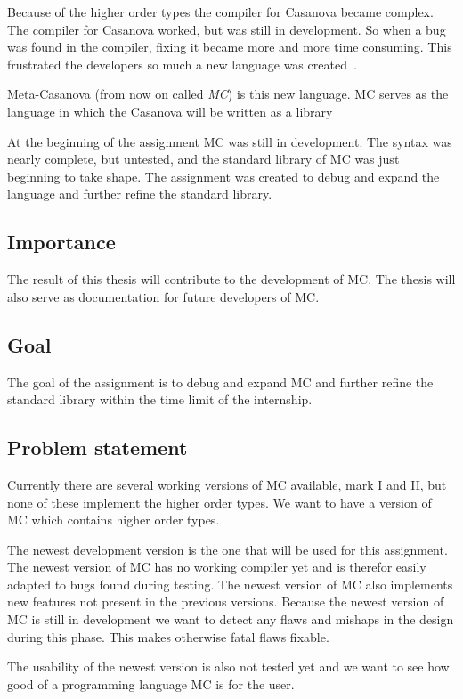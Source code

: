 Because of the higher order types the compiler for Casanova became complex.
The compiler for Casanova worked, but was still in development.
So when a bug was found in the compiler, fixing it became more and more time consuming.
This frustrated the developers so much a new language was created~\cite{giuseppe2015mc}.

Meta-Casanova (from now on called \emph{MC}) is this new language.
MC serves as the language in which the Casanova will be written as a library

At the beginning of the assignment MC was still in development.
The syntax was nearly complete, but untested, and the standard library of MC was just beginning to take shape.
The assignment was created to debug and expand the language and further refine the standard library.


\subsection{Importance}
The result of this thesis will contribute to the development of MC.
The thesis will also serve as documentation for future developers of MC.

\subsection{Goal}\label{sec:goalsmandate}
The goal of the assignment is to debug and expand MC and further refine the standard library within the time limit of the internship.

\subsection{Problem statement}
Currently there are several working versions of MC available, mark I and II, but none of these implement the higher order types.
We want to have a version of MC which contains higher order types.

The newest development version is the one that will be used for this assignment.
The newest version of MC has no working compiler yet and is therefor easily adapted to bugs found during testing.
The newest version of MC also implements new features not present in the previous versions.
Because the newest version of MC is still in development we want to detect any flaws and mishaps in the design during this phase.
This makes otherwise fatal flaws fixable.

The usability of the newest version is also not tested yet and we want to see how good of a programming language MC is for the user.

